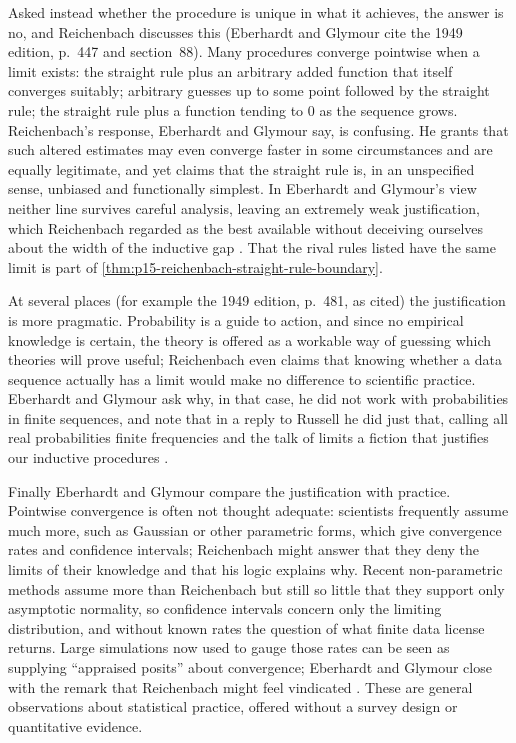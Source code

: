 Asked instead whether the procedure is unique in what it achieves, the
answer is no, and Reichenbach discusses this (Eberhardt and Glymour cite the 1949
edition, p.~447 and section~88). Many procedures converge pointwise when
a limit exists: the straight rule plus an arbitrary added function that
itself converges suitably; arbitrary guesses up to some point followed by
the straight rule; the straight rule plus a function tending to 0 as the
sequence grows. Reichenbach's response, Eberhardt and Glymour say, is confusing. He
grants that such altered estimates may even converge faster in some
circumstances and are equally legitimate, and yet claims that the
straight rule is, in an unspecified sense, unbiased and functionally
simplest. In Eberhardt and Glymour's view neither line survives careful analysis,
leaving an extremely weak justification, which Reichenbach regarded as
the best available without deceiving ourselves about the width of the
inductive gap \cite[p.~376 and n.~13]{EberhardtGlymour2011ReichenbachReading}.
That the rival rules listed have the same limit is part of
\cref{thm:p15-reichenbach-straight-rule-boundary}.

At several places (for example the 1949 edition, p.~481, as cited) the
justification is more pragmatic. Probability is a guide to action, and
since no empirical knowledge is certain, the theory is offered as a
workable way of guessing which theories will prove useful; Reichenbach
even claims that knowing whether a data sequence actually has a limit
would make no difference to scientific practice. Eberhardt and Glymour ask why, in
that case, he did not work with probabilities in finite sequences, and
note that in a reply to Russell he did just that, calling all real
probabilities finite frequencies and the talk of limits a fiction that
justifies our inductive procedures
\cite[p.~376]{EberhardtGlymour2011ReichenbachReading}.

Finally Eberhardt and Glymour compare the justification with practice. Pointwise
convergence is often not thought adequate: scientists frequently assume
much more, such as Gaussian or other parametric forms, which give
convergence rates and confidence intervals; Reichenbach might answer that
they deny the limits of their knowledge and that his logic explains why.
Recent non-parametric methods assume more than Reichenbach but still so
little that they support only asymptotic normality, so confidence
intervals concern only the limiting distribution, and without known
rates the question of what finite data license returns. Large
simulations now used to gauge those rates can be seen as supplying
``appraised posits'' about convergence; Eberhardt and Glymour close with the
remark that Reichenbach might feel vindicated
\cite[pp.~376--377]{EberhardtGlymour2011ReichenbachReading}. These are
general observations about statistical practice, offered without a
survey design or quantitative evidence.

